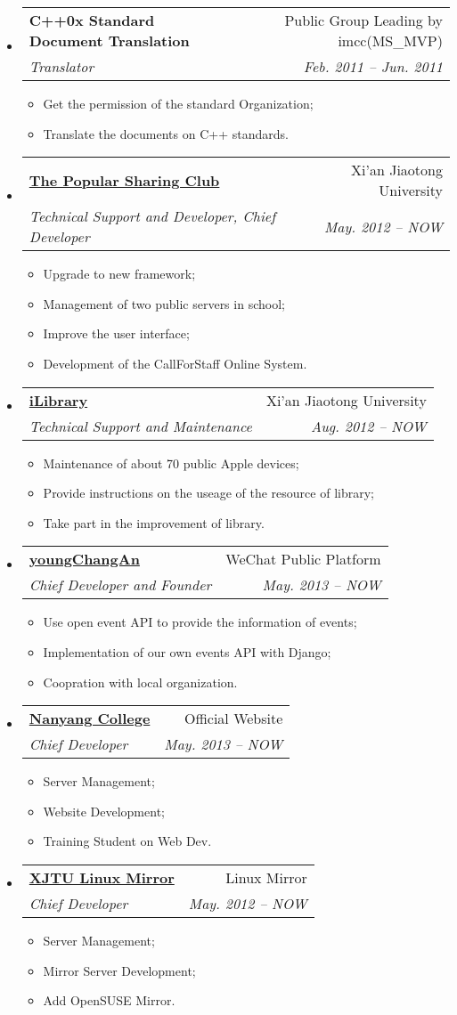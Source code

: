 \documentclass[letterpaper,11pt]{article}
\makeatletter
\newcommand{\resitem}[1]{\item #1 \vspace{-2pt}}
\newcommand{\ressubheading}[4]{
\begin{tabular*}{6.5in}{l@{\extracolsep{\fill}}r}
		\textbf{#1} & #2 \\
		\textit{#3} & \textit{#4} \\
\end{tabular*}\vspace{-6pt}}
\makeatother
\begin{document}
\begin{itemize}
{\begin{itemize}
				\end{itemize}
				}
		\item
			\ressubheading{C++0x Standard Document Translation}{Public Group Leading by imcc(MS\_MVP)}{Translator} {Feb. 2011 -- Jun. 2011}
				{ \footnotesize
				\begin{itemize}
					\resitem{Get the permission of the standard Organization;}
					\resitem{Translate the documents on C++ standards.}
				\end{itemize}
          		}
		\item 
			\ressubheading{\href{http://pt.xjtuns.cn/}{The Popular Sharing Club}}{Xi'an Jiaotong University}{Technical Support and Developer, Chief Developer}{May. 2012 -- NOW}
				{ \footnotesize
				\begin{itemize}
					\resitem{Upgrade to new framework;}
					\resitem{Management of two public servers in school;}
					\resitem{Improve the user interface;}
					\resitem{Development of the CallForStaff Online System.}
				\end{itemize}
				}
		\item 
			\ressubheading{\href{http://www.lib.xjtu.edu.cn/}{iLibrary}}{Xi'an Jiaotong University}{Technical Support and Maintenance}{Aug. 2012 -- NOW}
				{ \footnotesize
				\begin{itemize}
					\resitem{Maintenance of about 70 public Apple devices;}
					\resitem{Provide instructions on the useage of the resource of library;}
					\resitem{Take part in the improvement of library.}
				\end{itemize}
				}
		\item 
			\ressubheading{\href{http://nanyang.xjtu.edu.cn/WeChat/note.html}{youngChangAn}}{WeChat Public Platform}{Chief Developer and Founder}{May. 2013 -- NOW}
				{ \footnotesize
				\begin{itemize}
					\resitem{Use open event API to provide the information of events;}
					\resitem{Implementation of our own events API with Django;}
					\resitem{Coopration with local organization.}
				\end{itemize}
				}
		\item
			\ressubheading{\href{http://nanyang.xjtu.edu.cn/}{Nanyang College}}{Official Website}{Chief Developer}{May. 2013 -- NOW}
				{ \footnotesize
				\begin{itemize}
					\resitem{Server Management;}
					\resitem{Website Development;}
					\resitem{Training Student on Web Dev.}
				\end{itemize}
				}
		\item
			\ressubheading{\href{http://linux.xjtuns.cn/}{XJTU Linux Mirror}}{Linux Mirror}{Chief Developer}{May. 2012 -- NOW}
				{ \footnotesize
				\begin{itemize}
					\resitem{Server Management;}
					\resitem{Mirror Server Development;}
					\resitem{Add OpenSUSE Mirror.}
				\end{itemize}
				}
	\end{itemize}		
	
\end{document}
